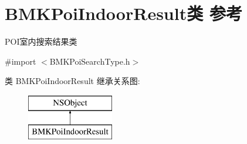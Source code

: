 \hypertarget{interface_b_m_k_poi_indoor_result}{}\section{B\+M\+K\+Poi\+Indoor\+Result类 参考}
\label{interface_b_m_k_poi_indoor_result}


P\+O\+I室内搜索结果类  




{\ttfamily \#import $<$B\+M\+K\+Poi\+Search\+Type.\+h$>$}

类 B\+M\+K\+Poi\+Indoor\+Result 继承关系图\+:\begin{figure}[H]
\begin{center}
\leavevmode
\includegraphics[height=2.000000cm]{interface_b_m_k_poi_indoor_result}
\end{center}
\end{figure}
